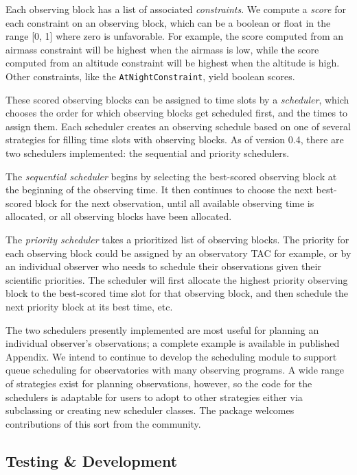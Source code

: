 Each observing block has a list of associated \textit{constraints}. We compute a \textit{score} for each constraint on an observing block, which can be a boolean or float in the range [0, 1] where zero is unfavorable. For example, the score computed from an airmass constraint will be highest when the airmass is low, while the score computed from an altitude constraint will be highest when the altitude is high. Other constraints, like the \texttt{AtNightConstraint}, yield boolean scores.

These scored observing blocks can be assigned to time slots by a \textit{scheduler}, which chooses the order for which observing blocks get scheduled first, and the times to assign them. Each scheduler creates an observing schedule based on one of several strategies for filling time slots with observing blocks. As of \astroplan version 0.4, there are two schedulers implemented: the sequential and priority schedulers. 

The \textit{sequential scheduler} begins by selecting the best-scored observing block at the beginning of the observing time. It then continues to choose the next best-scored block for the next observation, until all available observing time is allocated, or all observing blocks have been allocated. 

The \textit{priority scheduler} takes a prioritized list of observing blocks. The priority for each observing block could be assigned by an observatory TAC for example, or by an individual observer who needs to schedule their observations given their scientific priorities. The scheduler will first allocate the highest priority observing block to the best-scored time slot for that observing block, and then schedule the next priority block at its best time, etc. 

The two schedulers presently implemented are most useful for planning an individual observer's observations; a complete example is available in published Appendix. We intend to continue to develop the scheduling module to support queue scheduling for observatories with many observing programs. A wide range of strategies exist for planning observations, however, so the code for the schedulers is adaptable for users to adopt to other strategies either via subclassing or creating new scheduler classes.  The package welcomes contributions of this sort from the community.

\subsection{Testing \& Development}

